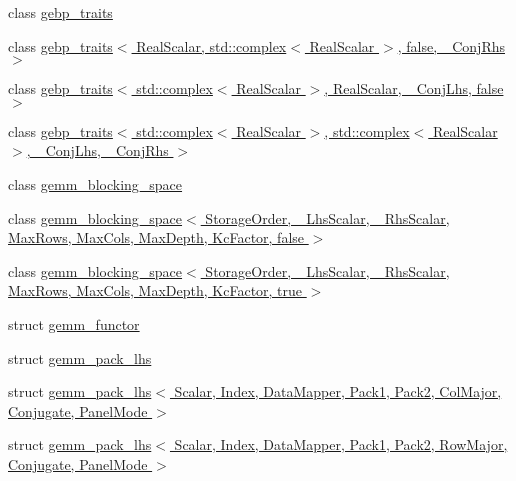 \begin{DoxyCompactItemize}
\item 
class \hyperlink{class_eigen_1_1internal_1_1gebp__traits}{gebp\+\_\+traits}
\item 
class \hyperlink{class_eigen_1_1internal_1_1gebp__traits_3_01_real_scalar_00_01std_1_1complex_3_01_real_scalar_01f99740ceef5f07e0f3738974eb65d89c}{gebp\+\_\+traits$<$ Real\+Scalar, std\+::complex$<$ Real\+Scalar $>$, false, \+\_\+\+Conj\+Rhs $>$}
\item 
class \hyperlink{class_eigen_1_1internal_1_1gebp__traits_3_01std_1_1complex_3_01_real_scalar_01_4_00_01_real_scald728c008ac4da8a5a1327d1e06be8c1f}{gebp\+\_\+traits$<$ std\+::complex$<$ Real\+Scalar $>$, Real\+Scalar, \+\_\+\+Conj\+Lhs, false $>$}
\item 
class \hyperlink{class_eigen_1_1internal_1_1gebp__traits_3_01std_1_1complex_3_01_real_scalar_01_4_00_01std_1_1com3fbe501975c876a010def81ad2701521}{gebp\+\_\+traits$<$ std\+::complex$<$ Real\+Scalar $>$, std\+::complex$<$ Real\+Scalar $>$, \+\_\+\+Conj\+Lhs, \+\_\+\+Conj\+Rhs $>$}
\item 
class \hyperlink{class_eigen_1_1internal_1_1gemm__blocking__space}{gemm\+\_\+blocking\+\_\+space}
\item 
class \hyperlink{class_eigen_1_1internal_1_1gemm__blocking__space_3_01_storage_order_00_01___lhs_scalar_00_01___rbcde58016e0f2e47700c92659db0c8a7}{gemm\+\_\+blocking\+\_\+space$<$ Storage\+Order, \+\_\+\+Lhs\+Scalar, \+\_\+\+Rhs\+Scalar, Max\+Rows, Max\+Cols, Max\+Depth, Kc\+Factor, false $>$}
\item 
class \hyperlink{class_eigen_1_1internal_1_1gemm__blocking__space_3_01_storage_order_00_01___lhs_scalar_00_01___reb401dd40e11c548a7d5e4b85e19f682}{gemm\+\_\+blocking\+\_\+space$<$ Storage\+Order, \+\_\+\+Lhs\+Scalar, \+\_\+\+Rhs\+Scalar, Max\+Rows, Max\+Cols, Max\+Depth, Kc\+Factor, true $>$}
\item 
struct \hyperlink{struct_eigen_1_1internal_1_1gemm__functor}{gemm\+\_\+functor}
\item 
struct \hyperlink{struct_eigen_1_1internal_1_1gemm__pack__lhs}{gemm\+\_\+pack\+\_\+lhs}
\item 
struct \hyperlink{struct_eigen_1_1internal_1_1gemm__pack__lhs_3_01_scalar_00_01_index_00_01_data_mapper_00_01_pack35996411e68d7a1338c3213e7fcd18dc}{gemm\+\_\+pack\+\_\+lhs$<$ Scalar, Index, Data\+Mapper, Pack1, Pack2, Col\+Major, Conjugate, Panel\+Mode $>$}
\item 
struct \hyperlink{struct_eigen_1_1internal_1_1gemm__pack__lhs_3_01_scalar_00_01_index_00_01_data_mapper_00_01_packfbcb3001ebc1820bc72c8fc2e505297d}{gemm\+\_\+pack\+\_\+lhs$<$ Scalar, Index, Data\+Mapper, Pack1, Pack2, Row\+Major, Conjugate, Panel\+Mode $>$}

\end{DoxyCompactItemize}
